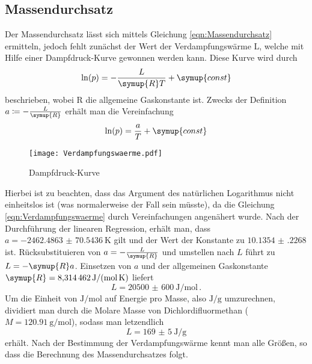 \subsection{Massendurchsatz}
Der Massendurchsatz lässt sich mittels Gleichung \eqref{eqn:Massendurchsatz} ermitteln, jedoch fehlt zunächst der Wert der Verdampfungswärme L, welche 
mit Hilfe einer Dampfdruck-Kurve gewonnen werden kann. Diese Kurve wird durch 
\begin{equation}
  \ln (p) = -\frac{L}{\symup{R}T} + \symup{const} \label{eqn:Verdampfungswaerme}
\end{equation}
beschrieben, wobei R die allgemeine Gaskonstante ist. Zwecks der Definition $a \coloneq -\frac{L}{\symup{R}}$ erhält man die Vereinfachung
\begin{equation}
  \ln (p) = \frac{a}{T} + \symup{const}
\end{equation}
\begin{figure}
  \centering
  \texttt{[image: Verdampfungswaerme.pdf]}
  \caption{Dampfdruck-Kurve}
  \label{fig:Dampfdruck}
\end{figure}
Hierbei ist zu beachten, dass das Argument des natürlichen Logarithmus nicht einheitslos ist (was normalerweise
der Fall sein müsste), da die Gleichung \eqref{eqn:Verdampfungswaerme} durch Vereinfachungen angenähert wurde.
Nach der Durchführung der linearen Regression, erhält man, dass $a = \SI{-2462.4863(705436)}{\kelvin}$ gilt und der Wert der Konstante zu $\num{10.1354(2268)}$ ist.
Rücksubstituieren von $a = -\frac{L}{\symup{R}}$ und umstellen nach $L$ führt zu $ L = - \symup{R}a$. Einsetzen von $a$ und der allgemeinen Gaskonstante 
$\symup{R} = \SI{8.314462}{\joule\per\mole\per\kelvin}$ \cite{allgGaskonstante} liefert
\begin{equation}
  L = \SI{20500(600)}{\joule\per\mol}\, .
\end{equation}
Um die Einheit von $\si{\joule\per\mole}$ auf Energie pro Masse, also $\si{\joule\per\gram}$ umzurechnen, dividiert man durch die Molare
Masse von Dichlordifluormethan ($M = \SI{120.91}{\gram\per\mole}$), sodass man letzendlich
\begin{equation}
  L = \SI{169(5)}{\joule\per\gram}
\end{equation}
erhält.
Nach der Bestimmung der Verdampfungswärme kennt man alle Größen, so dass die Berechnung des Massendurchsatzes folgt.
